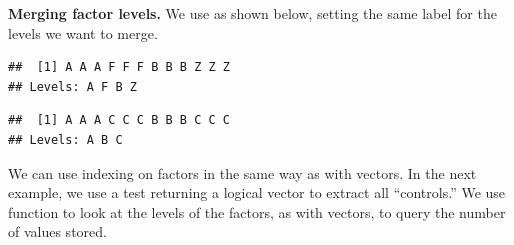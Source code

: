 \documentclass[krantz2]{krantz}\usepackage{knitr}
\begin{document}
\begin{explainbox}
\textbf{Merging factor levels.} We use  as shown below, setting the same label for the levels we want to merge.

\begin{knitrout}\footnotesize
{}\color{fgcolor}\begin{kframe}
\begin{alltt}
 \hlkwb{<-} \hlstd{(}\hlstd{,} \hlstd{,}  \hlstd{=} \hlstd{(}\hlstd{,} \hlstd{,} \hlstd{,} \hlstd{))}
\end{alltt}
\begin{verbatim}
##  [1] A A A F F F B B B Z Z Z
## Levels: A F B Z
\end{verbatim}
\begin{alltt}
        \hlstd{=} \hlstd{(}\hlstd{,} \hlstd{,} \hlstd{,} \hlstd{),}
        \hlstd{=} \hlstd{(}\hlstd{,} \hlstd{,} \hlstd{,} \hlstd{))}
\end{alltt}
\begin{verbatim}
##  [1] A A A C C C B B B C C C
## Levels: A B C
\end{verbatim}
\end{kframe}
\end{knitrout}
\end{explainbox}

We can use indexing on factors in the same way as with vectors. In the next example, we use a test returning a logical vector to extract all ``controls.'' We use function  to look at the levels of the factors, as with vectors,  to query the number of values stored.
\end{document}
